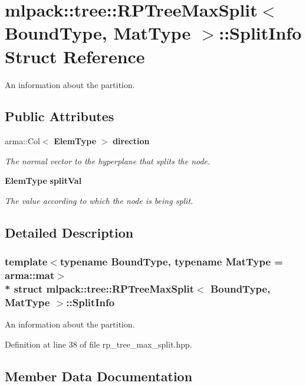 \section{mlpack\+:\+:tree\+:\+:R\+P\+Tree\+Max\+Split$<$ Bound\+Type, Mat\+Type $>$\+:\+:Split\+Info Struct Reference}
\label{structmlpack_1_1tree_1_1RPTreeMaxSplit_1_1SplitInfo}


An information about the partition.  


\subsection*{Public Attributes}
\begin{DoxyCompactItemize}
\item 
arma\+::\+Col$<$ {\bf Elem\+Type} $>$ {\bf direction}
\begin{DoxyCompactList}\small\item\em The normal vector to the hyperplane that splits the node. \end{DoxyCompactList}\item 
{\bf Elem\+Type} {\bf split\+Val}
\begin{DoxyCompactList}\small\item\em The value according to which the node is being split. \end{DoxyCompactList}\end{DoxyCompactItemize}


\subsection{Detailed Description}
\subsubsection*{template$<$typename Bound\+Type, typename Mat\+Type = arma\+::mat$>$\\*
struct mlpack\+::tree\+::\+R\+P\+Tree\+Max\+Split$<$ Bound\+Type, Mat\+Type $>$\+::\+Split\+Info}

An information about the partition. 

Definition at line 38 of file rp\+\_\+tree\+\_\+max\+\_\+split.\+hpp.



\subsection{Member Data Documentation}
